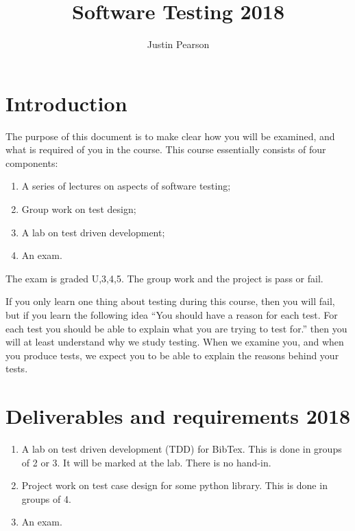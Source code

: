 \documentclass[a4page]{article}
\title{Software Testing 2018}
\author{Justin Pearson}
\begin{document}
\maketitle

\def\UrlBreaks{\do\/\do-}       %
\section{Introduction}
The purpose of this document is to make clear how you will be examined, and
what is required of you in the course.  This course essentially consists of
four components:
\begin{enumerate}
\item A series of lectures on aspects of software testing;
\item Group work on test design;
\item A lab on test driven development;
\item An exam.
\end{enumerate}
The exam is graded U,3,4,5. The group work and the project is pass or fail.

If you only learn one thing about testing during this course, then you will
fail, but if you learn the following idea ``You should have a reason for each
test. For each test you should be able to explain what you are trying to test
for.'' then you will at least understand why we study testing. When we examine
you, and when you produce tests, we expect you to be able to explain the
reasons behind your tests.


\section{Deliverables and requirements  2018}



\begin{enumerate}
\item A lab on  test driven development (TDD) for  BibTex.   This is
  done in groups of 2 or 3. It will be marked at the lab. There is no
  hand-in. 


\item Project work on test case design for some python library. This
  is done in groups of 4.
\item An exam.

  \end{enumerate}
\end{document}
